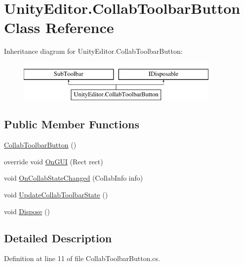 \hypertarget{class_unity_editor_1_1_collab_toolbar_button}{}\section{Unity\+Editor.\+Collab\+Toolbar\+Button Class Reference}
\label{class_unity_editor_1_1_collab_toolbar_button}
Inheritance diagram for Unity\+Editor.\+Collab\+Toolbar\+Button\+:\begin{figure}[H]
\begin{center}
\leavevmode
\includegraphics[height=2.000000cm]{class_unity_editor_1_1_collab_toolbar_button}
\end{center}
\end{figure}
\subsection*{Public Member Functions}
\begin{DoxyCompactItemize}
\item 
\mbox{\hyperlink{class_unity_editor_1_1_collab_toolbar_button_a6495491ce0577c6e269320479c1cd39e}{Collab\+Toolbar\+Button}} ()
\item 
override void \mbox{\hyperlink{class_unity_editor_1_1_collab_toolbar_button_aa3c538550fba2437f689458095cc5979}{On\+G\+UI}} (Rect rect)
\item 
void \mbox{\hyperlink{class_unity_editor_1_1_collab_toolbar_button_afc002429a2ef73b47d0f54972333537b}{On\+Collab\+State\+Changed}} (Collab\+Info info)
\item 
void \mbox{\hyperlink{class_unity_editor_1_1_collab_toolbar_button_ac0b3213298e3dead1742c10e9b65f5f9}{Update\+Collab\+Toolbar\+State}} ()
\item 
void \mbox{\hyperlink{class_unity_editor_1_1_collab_toolbar_button_a09ef0c4fd1ad2688bba4a07197c21e05}{Dispose}} ()
\end{DoxyCompactItemize}


\subsection{Detailed Description}


Definition at line 11 of file Collab\+Toolbar\+Button.\+cs.



